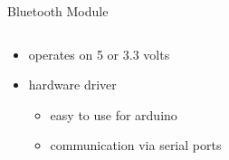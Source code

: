 \documentclass{beamer}
\begin{document}
	\begin{frame}[t]{Bluetooth Module}
		\begin{columns}[T]
			\begin{column}{0.5\textwidth}
				\begin{minipage}{\textwidth}
					\resizebox{0.9\textwidth}{!}{}
				\end{minipage}
				\begin{minipage}{\textwidth}
					\vspace{0.5cm}
					\begin{itemize}
						\item operates on 5 or 3.3 volts
						\item hardware driver
							\begin{itemize}
								\item easy to use for arduino
								\item communication via serial ports
							\end{itemize}
					\end{itemize}
				\end{minipage}
			\end{column}
			\begin{column}{0.5\textwidth}
			\end{column}
		\end{columns}
	\end{frame}
\end{document}
